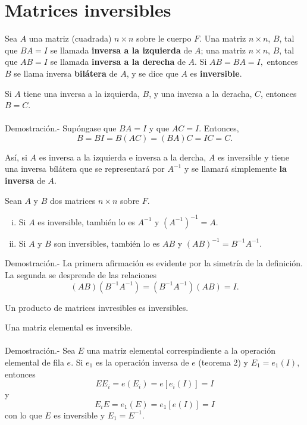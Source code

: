 \section{Matrices inversibles}

\begin{def.}
    Sea $A$ una matriz (cuadrada) $n\times n$ sobre le cuerpo $F$. Una matriz $n\times n$, $B$, tal que $BA=I$ se llamada \textbf{inversa a la izquierda} de $A$; una matriz $n\times n$, $B$, tal que $AB=I$ se llamada \textbf{inversa a la derecha} de $A$. Si $AB=BA=I,$ entonces $B$ se llama inversa \textbf{bilátera} de $A$, y se dice que $A$ es \textbf{inversible}.
\end{def.}

\begin{lema}
    Si $A$ tiene una inversa a la izquierda, $B$, y una inversa a la deracha, $C$, entonces $B=C$.\\\\
	Demostración.-\; Supóngase que $BA=I$ y que $AC=I$. Entonces,
	$$B=BI=B(AC)=(BA)C=IC=C.$$
\end{lema}

Así, si $A$ es inversa a la izquierda e inversa a la dercha, $A$ es inversible y tiene una inversa bílátera que se representará por $A^{-1}$ y se llamará simplemente \textbf{la inversa} de $A$.

\begin{teo}
    Sean $A$ y $B$ dos matrices $n\times n$ sobre $F$.

    \begin{enumerate}[(i)]
	\item Si $A$ es inversible, también lo es $A^{-1}$ y $\left(A^{-1}\right)^{-1}=A.$
	\item Si $A$ y $B$ son inversibles, también lo es $AB$ y $(AB)^{-1}=B^{-1}A^{-1}.$\\
    \end{enumerate}
	Demostración.-\; La primera afirmación es evidente por la simetría de la definición. La segunda se desprende de las relaciones 
	$$(AB)\left(B^{-1}A^{-1}\right)=\left(B^{-1}A^{-1}\right)(AB)=I.$$
\end{teo}

\begin{cor}
    Un producto de matrices invresibles es inversibles.
\end{cor}

\begin{teo}
    Una matriz elemental es inversible.\\\\
    	Demostración.-\; Sea $E$ una matriz elemental correspindiente a la operación elemental de fila $e$. Si $e_1$ es la operación inversa de $e$ (teorema 2) y $E_1=e_1(I)$, entonces
	$$EE_i=e(E_i)=e\left[e_i(I)\right]=I$$
	y
	$$E_iE=e_1(E)=e_1\left[e(I)\right]=I$$
	con lo que $E$ es inversible y $E_1=E^{-1}.$
\end{teo}
